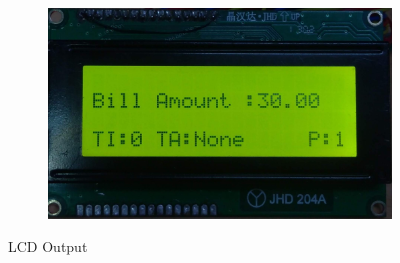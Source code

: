 \documentclass[12pt,a4paper]{article}
\begin{document}
\begin{figure}[h]
\begin{subfigure}{.5\textwidth}
		\end{subfigure}%
		\begin{subfigure}{.5\textwidth}
			\centering
			\includegraphics[width=1\textwidth]{bill_amount}
		\end{subfigure}
			\caption[short]{LCD Output}
		\end{figure}		    	
    \newpage
\end{document}
